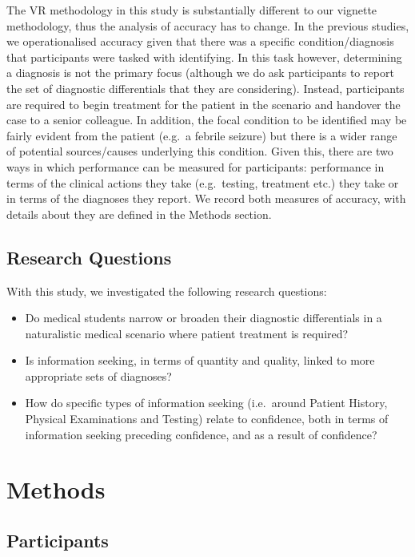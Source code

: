 \documentclass[a4paper, nobind]{templates/ociamthesis}
\providecommand{\tightlist}{%
  \setlength{\itemsep}{0pt}\setlength{\parskip}{0pt}}
\begin{document}
\hfill\break
The VR methodology in this study is substantially different to our vignette methodology, thus the analysis of accuracy has to change. In the previous studies, we operationalised accuracy given that there was a specific condition/diagnosis that participants were tasked with identifying. In this task however, determining a diagnosis is not the primary focus (although we do ask participants to report the set of diagnostic differentials that they are considering). Instead, participants are required to begin treatment for the patient in the scenario and handover the case to a senior colleague. In addition, the focal condition to be identified may be fairly evident from the patient (e.g.~a febrile seizure) but there is a wider range of potential sources/causes underlying this condition. Given this, there are two ways in which performance can be measured for participants: performance in terms of the clinical actions they take (e.g.~testing, treatment etc.) they take or in terms of the diagnoses they report. We record both measures of accuracy, with details about they are defined in the Methods section.

\subsection{Research Questions}\label{research-questions-2}

With this study, we investigated the following research questions:

\begin{itemize}
\tightlist
\item
  Do medical students narrow or broaden their diagnostic differentials in a naturalistic medical scenario where patient treatment is required?
\item
  Is information seeking, in terms of quantity and quality, linked to more appropriate sets of diagnoses?
\item
  How do specific types of information seeking (i.e.~around Patient History, Physical Examinations and Testing) relate to confidence, both in terms of information seeking preceding confidence, and as a result of confidence?
\end{itemize}

\section{Methods}\label{methods-3}

\subsection{Participants}\label{participants-2}
\end{document}
